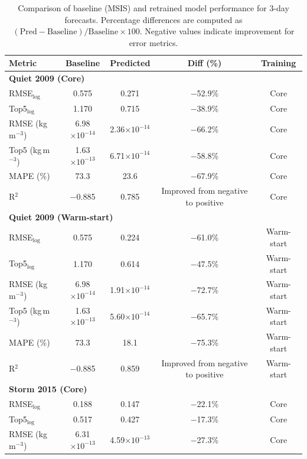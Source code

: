 \begin{table}[!ht]
\centering
\caption{Comparison of baseline (MSIS) and retrained model performance for
3-day forecasts. Percentage differences are computed as
$(\mathrm{Pred}-\mathrm{Baseline})/\mathrm{Baseline}\times100$. Negative values
indicate improvement for error metrics.}
\label{tab:dr_results_h3}
\begin{tabular}{lcccc}
\hline
\textbf{Metric} & \textbf{Baseline} & \textbf{Predicted} & \textbf{Diff (\%)} & \textbf{Training} \\
\hline \hline
\multicolumn{5}{l}{\textbf{Quiet 2009 (Core)}} \\
RMSE$_{\log}$ & 0.575 & 0.271 & $-$52.9\% & Core \\
Top5$_{\log}$ & 1.170 & 0.715 & $-$38.9\% & Core \\
RMSE (kg\,m$^{-3}$) & 6.98$\times10^{-14}$ & 2.36$\times10^{-14}$ & $-$66.2\% & Core \\
Top5 (kg\,m$^{-3}$) & 1.63$\times10^{-13}$ & 6.71$\times10^{-14}$ & $-$58.8\% & Core \\
MAPE (\%) & 73.3 & 23.6 & $-$67.9\% & Core \\
R$^2$ & $-$0.885 & 0.785 & Improved from negative to positive & Core \\
\hline
\multicolumn{5}{l}{\textbf{Quiet 2009 (Warm-start)}} \\
RMSE$_{\log}$ & 0.575 & 0.224 & $-$61.0\% & Warm-start \\
Top5$_{\log}$ & 1.170 & 0.614 & $-$47.5\% & Warm-start \\
RMSE (kg\,m$^{-3}$) & 6.98$\times10^{-14}$ & 1.91$\times10^{-14}$ & $-$72.7\% & Warm-start \\
Top5 (kg\,m$^{-3}$) & 1.63$\times10^{-13}$ & 5.60$\times10^{-14}$ & $-$65.7\% & Warm-start \\
MAPE (\%) & 73.3 & 18.1 & $-$75.3\% & Warm-start \\
R$^2$ & $-$0.885 & 0.859 & Improved from negative to positive & Warm-start \\
\hline \hline
\multicolumn{5}{l}{\textbf{Storm 2015 (Core)}} \\
RMSE$_{\log}$ & 0.188 & 0.147 & $-$22.1\% & Core \\
Top5$_{\log}$ & 0.517 & 0.427 & $-$17.3\% & Core \\
RMSE (kg\,m$^{-3}$) & 6.31$\times10^{-13}$ & 4.59$\times10^{-13}$ & $-$27.3\% & Core \\

\end{tabular}
\end{table}
